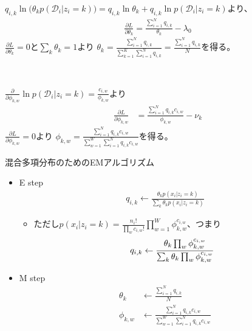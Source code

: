 \documentclass[aspectratio=169,unicode,dvipdfmx,14pt]{beamer}
\begin{document}
\begin{frame}
\FontMath
$q_{i,k} \ln \big( \theta_k p(\mathcal{D}_i | z_i = k) \big)
= q_{i,k} \ln \theta_k + q_{i,k} \ln p(\mathcal{D}_i | z_i = k)$より、
\begin{align}
\frac{\partial L}{\partial \theta_k}
= \frac{ \sum_{i=1}^N  q_{i,k} }{ \theta_k } - \lambda_0
\end{align}
$\frac{\partial L}{\partial \theta_k} = 0$と$\sum_k \theta_k = 1$より
$\theta_k = \frac{ \sum_{i=1}^N q_{i,k} }{ \sum_{k=1}^K \sum_{i=1}^N q_{i,k} } = \frac{ \sum_{i=1}^N q_{i,k} }{ N }$を得る。

\

$\frac{\partial }{\partial \phi_{k,w}} \ln p(\mathcal{D}_i | z_i = k) = \frac{ c_{i,w} }{ \phi_{k,w} }$より
\begin{align}
\frac{\partial L}{\partial \phi_{k,w}}
& = \frac{ \sum_{i=1}^N q_{i,k} c_{i,w} }{ \phi_{k,w} } - \nu_k
\end{align}
$\frac{\partial L}{\partial \phi_{k,w}} = 0$より
$\phi_{k,w} = \frac{ \sum_{i=1}^N q_{i,k} c_{i,w} }{ \sum_{w=1}^W \sum_{i=1}^N q_{i,k} c_{i,w} }$を得る。
\end{frame}

\begin{frame}{混合多項分布のためのEMアルゴリズム}
\vspace{-.1in}
\begin{itemize}
\item E step
\vspace{-.1in}
\begin{align}
q_{i,k} \leftarrow \frac{ \theta_k p(x_i | z_i = k) }{ \sum_k \theta_k p(x_i | z_i = k) }
\end{align}
\vspace{-.1in}
\begin{itemize}
\item[] ただし$p(x_i | z_i = k) = \frac{n_i!}{\prod_w c_{i,w}!} \prod_{w=1}^W \phi_{k,w}^{c_{i,w}}$、つまり
\begin{align}
q_{i,k} \leftarrow \frac{ \theta_k \prod_w \phi_{k,w}^{c_{i,w}} }{ \sum_k \theta_k \prod_w \phi_{k,w}^{c_{i,w}} } \notag
\end{align}
\end{itemize}
\vspace{-.1in}
\item M step
\vspace{-.1in}
\begin{align}
\theta_k & \leftarrow \frac{ \sum_{i=1}^N q_{i,k} }{ N } \\
\phi_{k,w} & \leftarrow \frac{ \sum_{i=1}^N q_{i,k} c_{i,w} }{ \sum_{w=1}^W \sum_{i=1}^N q_{i,k} c_{i,w} }
\end{align}
\end{itemize}
\end{frame}
\end{document}
